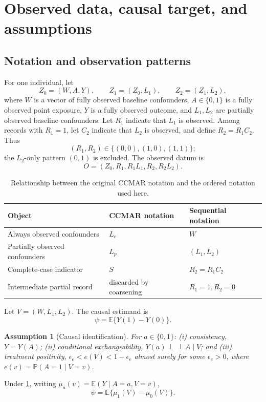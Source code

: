 \documentclass[11pt]{article}
\newtheorem{assumption}{Assumption}
\theoremstyle{definition}
\newcommand{\E}{\mathbb{E}}
\newcommand{\Pp}{\mathbb{P}}
\newcommand{\indep}{\perp\!\!\!\perp}
\newcommand{\1}{\mathbf{1}}
\begin{document}
\section{Observed data, causal target, and assumptions}

\subsection{Notation and observation patterns}

For one individual, let
\[
Z_0=(W,A,Y),\qquad Z_1=(Z_0,L_1),\qquad Z_2=(Z_1,L_2),
\]
where $W$ is a vector of fully observed baseline confounders, $A\in\{0,1\}$ is a fully observed point exposure, $Y$ is a fully observed outcome, and $L_1,L_2$ are partially observed baseline confounders. Let $R_1$ indicate that $L_1$ is observed. Among records with $R_1=1$, let $C_2$ indicate that $L_2$ is observed, and define $R_2=R_1C_2$. Thus
\[
(R_1,R_2)\in\{(0,0),(1,0),(1,1)\};
\]
the $L_2$-only pattern $(0,1)$ is excluded. The observed datum is
\[
O=(Z_0,R_1,R_1L_1,R_2,R_2L_2).
\]

\begin{table}[ht]
\centering
\caption{Relationship between the original CCMAR notation and the ordered notation used here.}
\label{tab:notation}
\begin{tabularx}{0.92\textwidth}{@{}lXX@{}}
\toprule
Object & CCMAR notation & Sequential notation \\
\midrule
Always observed confounders & $L_c$ & $W$ \\
Partially observed confounders & $L_p$ & $(L_1,L_2)$ \\
Complete-case indicator & $S$ & $R_2=R_1C_2$ \\
Intermediate partial record & discarded by coarsening & $R_1=1,R_2=0$ \\
\bottomrule
\end{tabularx}
\end{table}

Let $V=(W,L_1,L_2)$. The causal estimand is
\[
\psi=\E\{Y(1)-Y(0)\}.
\]

\begin{assumption}[Causal identification]\label{ass:causal}
For $a\in\{0,1\}$: (i) consistency, $Y=Y(A)$; (ii) conditional exchangeability, $Y(a)\indep A\mid V$; and (iii) treatment positivity, $\epsilon_e<e(V)<1-\epsilon_e$ almost surely for some $\epsilon_e>0$, where $e(v)=\Pp(A=1\mid V=v)$.
\end{assumption}

Under \cref{ass:causal}, writing $\mu_a(v)=\E(Y\mid A=a,V=v)$,
\begin{equation}\label{eq:ate-gformula}
\psi=\E\{\mu_1(V)-\mu_0(V)\}.
\end{equation}
\end{document}
